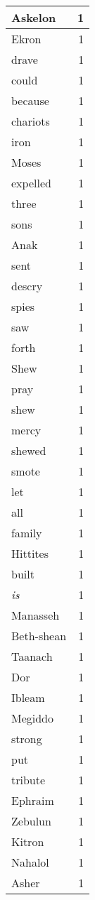 \begin{center}
\begin{longtable}{l|r}
Askelon & 1 \\ \hline
Ekron & 1 \\ \hline
drave & 1 \\ \hline
could & 1 \\ \hline
because & 1 \\ \hline
chariots & 1 \\ \hline
iron & 1 \\ \hline
Moses & 1 \\ \hline
expelled & 1 \\ \hline
three & 1 \\ \hline
sons & 1 \\ \hline
Anak & 1 \\ \hline
sent & 1 \\ \hline
descry & 1 \\ \hline
spies & 1 \\ \hline
saw & 1 \\ \hline
forth & 1 \\ \hline
Shew & 1 \\ \hline
pray & 1 \\ \hline
shew & 1 \\ \hline
mercy & 1 \\ \hline
shewed & 1 \\ \hline
smote & 1 \\ \hline
let & 1 \\ \hline
all & 1 \\ \hline
family & 1 \\ \hline
Hittites & 1 \\ \hline
built & 1 \\ \hline
\emph{is} & 1 \\ \hline
Manasseh & 1 \\ \hline
Beth-shean & 1 \\ \hline
Taanach & 1 \\ \hline
Dor & 1 \\ \hline
Ibleam & 1 \\ \hline
Megiddo & 1 \\ \hline
strong & 1 \\ \hline
put & 1 \\ \hline
tribute & 1 \\ \hline
Ephraim & 1 \\ \hline
Zebulun & 1 \\ \hline
Kitron & 1 \\ \hline
Nahalol & 1 \\ \hline
Asher & 1 \\ \hline

\end{longtable}
\end{center}
